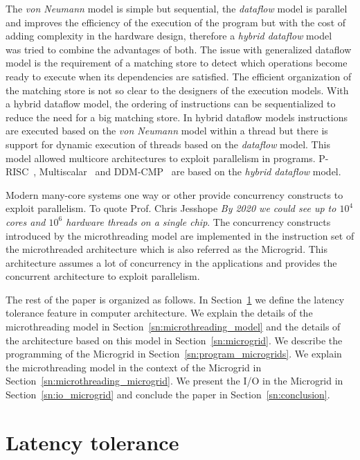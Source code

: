 \documentclass{article}
\begin{document}
The \emph{von Neumann} model is simple but sequential, the \emph{dataflow}
model is parallel and improves the efficiency of the execution of the program
but with the cost of adding complexity in the hardware design, therefore a
\emph{hybrid dataflow} model~\cite{5009501,Iannucci:1988:TDN:633625.52416}
was tried to combine the advantages of both. The issue with generalized
dataflow model is the requirement of a matching store to detect which
operations become ready to execute when its dependencies are satisfied. The
efficient organization of the matching store is not so clear to the designers
of the execution models. With a hybrid dataflow model, the ordering of
instructions can be sequentialized to reduce the need for a big matching store.
In hybrid dataflow models instructions are executed based on the \emph{von
Neumann} model within a thread but there is support for dynamic execution of
threads based on the \emph{dataflow} model. This model allowed multicore
architectures to exploit parallelism in programs.
P-RISC~\cite{Razdan:1994:PSA:645462.655024},
Multiscalar~\cite{Sohi:1995:MP:225830.224451} and
DDM-CMP~\cite{stavrou:ddm-cmp:} are based on the \emph{hybrid dataflow}
model.

Modern many-core systems one way or other provide concurrency constructs to
exploit parallelism. To quote Prof. Chris Jesshope \emph{By 2020 we could see
up to $10^4$ cores and $10^6$ hardware threads on a single chip}. The
concurrency constructs introduced by the microthreading model are implemented
in the instruction set of the microthreaded architecture which is also referred
as the Microgrid. This architecture assumes a lot of concurrency in the
applications and provides the concurrent architecture to exploit parallelism.


The rest of the paper is organized as follows. In Section~\ref{sn:latency_tolerance}
we define the latency tolerance feature in computer architecture. We explain
the details of the microthreading model in Section~\ref{sn:microthreading_model} and
the details of the architecture based on this model in Section~\ref{sn:microgrid}. We
describe the programming of the Microgrid in Section~\ref{sn:program_microgrids}. We
explain the microthreading model in the context of the Microgrid
in Section~\ref{sn:microthreading_microgrid}. 
We present the I/O in the Microgrid in Section~\ref{sn:io_microgrid} and conclude the
paper in Section~\ref{sn:conclusion}.

\section{Latency tolerance}\label{sn:latency_tolerance}
\end{document}

